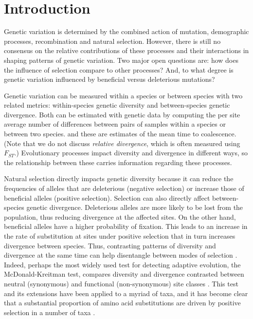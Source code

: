 \section{Introduction}

Genetic variation is determined by the combined action of mutation, demographic processes, recombination and natural selection.
However, there is still no consensus on the relative contributions of these processes and 
their interactions in shaping patterns of genetic variation.
Two major open questions are: how does the influence of selection compare to other processes?
And, to what degree is genetic variation influenced by beneficial versus deleterious mutations?

Genetic variation can be measured within a species or between species with two related metrics: within-species genetic diversity and between-species genetic divergence.
Both can be estimated with genetic data by computing the per site average number of differences between pairs of samples within a species or between two species.
and these are estimates of the mean time to coalescence.
(Note that we do not discuss \emph{relative divergence},
which is often measured using $F_{ST}$.)
Evolutionary processes impact diversity and divergence in different ways, so the relationship between these carries information regarding these processes.

Natural selection directly impacts genetic diversity because it can reduce the frequencies of alleles that are deleterious (negative selection)
or increase those of beneficial alleles (positive selection).
Selection can also directly affect between-species genetic divergence.
Deleterious alleles are more likely to be lost from the population, thus reducing divergence at the affected sites.
On the other hand, beneficial alleles have a higher probability of fixation.
This leads to an increase in the rate of substitution at sites under positive selection that in turn
increases divergence between species.
Thus, contrasting patterns of diversity and divergence at the same time can help disentangle between modes of selection \parencite{hudson_test_1987}.
Indeed, perhaps the most widely used test for detecting adaptive evolution, the McDonald-Kreitman test,
compares diversity and divergence contrasted between neutral (\eg synonymous) and functional (\eg non-synonymous) site classes \parencite{mcdonald_adaptive_1991}.
This test and its extensions have been applied to a myriad of taxa,
and it has become clear that a substantial proportion of amino acid substitutions
are driven by positive selection in a number of taxa \parencite{smith_adaptive_2002, ingvarsson_natural_2010, slotte_impact_2014,galtier_adaptive_2016}.

